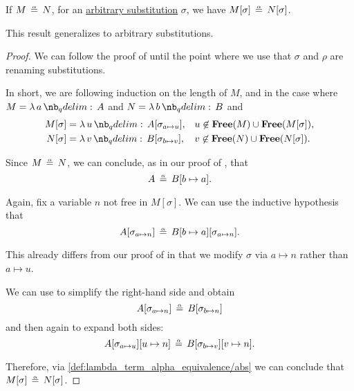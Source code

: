 \begin{proposition}\label{thm:substitution_on_alpha_equivalent_terms}
  If \( M \aequiv N \), for an \hyperref[def:lambda_substitution]{arbitrary substitution} \( \sigma \), we have \( M[\sigma] \aequiv N[\sigma] \).
\end{proposition}
\begin{comments}
  \item This result generalizes  to arbitrary substitutions.
\end{comments}
\begin{proof}
  We can follow the proof of  until the point where we use that \( \sigma \) and \( \rho \) are renaming substitutions.

  In short, we are following induction on the length of \( M \), and in the case where \( M = \qabs a A \) and \( N = \qabs b B \) and
  \begin{align*}
    M[\sigma] &= \qabs u A[\sigma_{a \mapsto u}], &&u \not\in \op*{Free}(M) \cup \op*{Free}(M[\sigma]), \\
    N[\sigma] &= \qabs v B[\sigma_{b \mapsto v}], &&v \not\in \op*{Free}(N) \cup \op*{Free}(N[\sigma]).
  \end{align*}

  Since \( M \aequiv N \), we can conclude, as in our proof of , that
  \begin{equation*}
    A \aequiv B[b \mapsto a].
  \end{equation*}

  Again, fix a variable \( n \) not free in \( M[\sigma] \). We can use the inductive hypothesis that
  \begin{equation*}
    A[\sigma_{a \mapsto n}] \aequiv B[b \mapsto a][\sigma_{a \mapsto n}].
  \end{equation*}

  This already differs from our proof of  in that we modify \( \sigma \) via \( a \mapsto n \) rather than \( a \mapsto u \).

  We can use  to simplify the right-hand side and obtain
  \begin{equation*}
    A[\sigma_{a \mapsto n}] \aequiv B[\sigma_{b \mapsto n}]
  \end{equation*}
  and then again to expand both sides:
  \begin{equation*}
    A[\sigma_{a \mapsto u}][u \mapsto n] \aequiv B[\sigma_{b \mapsto v}][v \mapsto n].
  \end{equation*}

  Therefore, via \ref{def:lambda_term_alpha_equivalence/abs} we can conclude that \( M[\sigma] \aequiv N[\sigma] \).
\end{proof}

